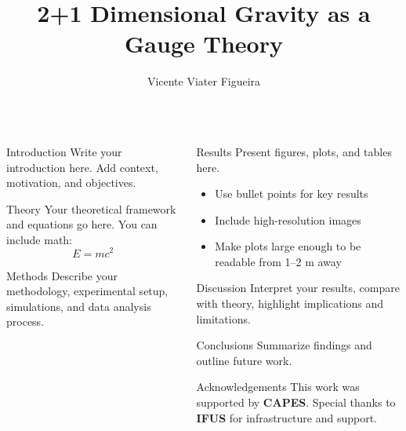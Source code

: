 \documentclass[final]{beamer}
\title{\textbf{2+1 Dimensional Gravity as a Gauge Theory}}
\author{Vicente Viater Figueira}
\institute{Institute of Physics (IFUSP)}
\begin{document}
\begin{frame}[t]

\begin{center}
  {\Huge \bfseries \inserttitle \par}
  \vspace{1cm}
  {\Large \insertauthor \par}
  \vspace{0.5cm}
  {\large \insertinstitute \par}
\end{center}

\vspace{1.5cm}

\begin{columns}[t,totalwidth=\textwidth]

\begin{column}{0.48\textwidth}
  \begin{block}{Introduction}
    Write your introduction here. 
    Add context, motivation, and objectives.
  \end{block}

  \begin{block}{Theory}
    Your theoretical framework and equations go here.
    You can include math:
    \[
      E = mc^2
    \]
  \end{block}

  \begin{block}{Methods}
    Describe your methodology, experimental setup, 
    simulations, and data analysis process.
  \end{block}
\end{column}

\begin{column}{0.48\textwidth}
  \begin{block}{Results}
    Present figures, plots, and tables here.
    \begin{itemize}
      \item Use bullet points for key results
      \item Include high-resolution images
      \item Make plots large enough to be readable from 1–2 m away
    \end{itemize}
  \end{block}

  \begin{block}{Discussion}
    Interpret your results, compare with theory,
    highlight implications and limitations.
  \end{block}

  \begin{block}{Conclusions}
    Summarize findings and outline future work.
  \end{block}

  \begin{block}{Acknowledgements}
    This work was supported by \textbf{CAPES}.  
    Special thanks to \textbf{IFUS} for infrastructure and support.
  \end{block}
\end{column}

\end{columns}
\end{frame}
\end{document}
